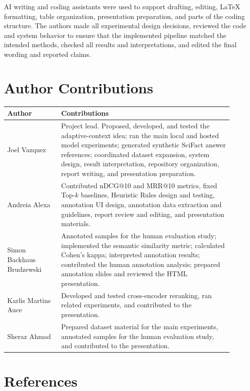 \documentclass[11pt]{article}
\begin{document}
AI writing and coding assistants were used to support drafting, editing, LaTeX formatting, table organization, presentation preparation, and parts of the coding structure. The authors made all experimental design decisions, reviewed the code and system behavior to ensure that the implemented pipeline matched the intended methods, checked all results and interpretations, and edited the final wording and reported claims.

\section*{Author Contributions}

\begin{center}
\small
\begin{tabular}{p{0.22\linewidth}p{0.70\linewidth}}
\toprule
Author & Contributions \\
\midrule
Joel Vazquez &
Project lead. Proposed, developed, and tested the adaptive-context idea; ran the main local and hosted model experiments; generated synthetic SciFact answer references; coordinated dataset expansion, system design, result interpretation, repository organization, report writing, and presentation preparation. \\
\midrule
Andreia Alexa &
Contributed nDCG@10 and MRR@10 metrics, fixed Top-$k$ baselines, Heuristic Rules design and testing, annotation UI design, annotation data extraction and guidelines, report review and editing, and presentation materials. \\
\midrule
Simon Backhaus Brudzewski &
Annotated samples for the human evaluation study; implemented the semantic similarity metric; calculated Cohen's kappa; interpreted annotation results; contributed the human annotation analysis; prepared annotation slides and reviewed the HTML presentation. \\
\midrule
Karlis Martins Auce &
Developed and tested cross-encoder reranking, ran related experiments, and contributed to the presentation. \\
\midrule
Sheraz Ahmad &
Prepared dataset material for the main experiments, annotated samples for the human evaluation study, and contributed to the presentation. \\
\bottomrule
\end{tabular}
\end{center}

\section*{References}
\end{document}

